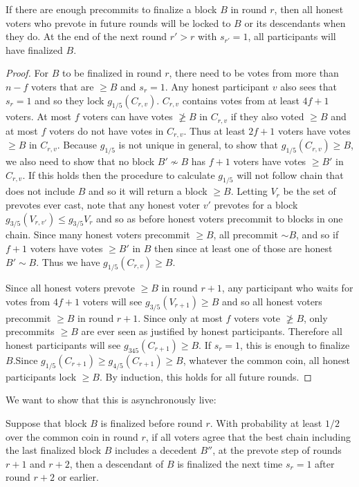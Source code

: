 \documentclass[a4paper,UKenglish,cleveref, autoref, thm-restate, anonymous]{lipics-v2019}
\begin{document}
{\begin{lemma} \label{lem:possibly-final-implies-permanent-lock}
If there are enough precommits to finalize a block $B$ in round $r$, then all honest voters who prevote in future rounds will be locked to $B$ or its descendants when they do. At the end of the next round $r' > r$ with $s_{r'}=1$, all participants will have finalized $B$.
\end{lemma}
\begin{proof}
For $B$ to be finalized in round $r$, there need to be votes from more than $n-f$ voters that are $\geq B$ and $s_r=1$. Any honest participant $v$ also sees that $s_r=1$ and so they lock $g_{1/5}(C_{r,v})$. $C_{r,v}$ contains votes from at least $4f+1$ voters. At most $f$  voters can have votes  $\not\geq B$ in $C_{r,v}$ if they also voted $\geq B$ and at most $f$ voters do not have votes in $C_{r,v}$.
 Thus at least $2f+1$ voters have votes $\geq B$ in $C_{r,v}$. Because $g_{1/5}$ is not unique in general, to show that $g_{1/5}(C_{r,v}) \geq B$, we also need to show that no block $B' \nsim B$ has $f+1$ voters have votes $\geq B'$ in $C_{r,v}$. If this holds then the procedure to calculate $g_{1/5}$ will not follow chain that does not include $B$ and so it will return a block $\geq B$.
 Letting $V_r$ be the set of prevotes ever cast, note that any honest voter $v'$ prevotes for a block $g_{3/5}(V_{r,v'}) \leq g_{3/5}{V_r}$ and so as before honest voters precommit to blocks in one chain.
 Since many honest voters precommit $\geq B$, all precommit $\sim B$, and so if $f+1$ voters have votes $\geq B'$ in $B$ then since at least one of those are honest $B' \sim B$. Thus we have $g_{1/5}(C_{r,v}) \geq B$.

Since all honest voters prevote $\geq B$ in round $r+1$, any participant who waits for votes from $4f+1$ voters will see $g_{3/5}(V_{r+1}) \geq B$ and so all honest voters precommit $\geq B$ in round $r+1$. Since only at most $f$ voters vote $\not \geq B$, only precommits $\geq B$ are ever seen as justified by honest participants. Therefore all honest participants will see $g_{345}(C_{r+1}) \geq 
B$.
If $s_r=1$, this is enough to finalize $B$.Since $g_{1/5}(C_{r+1}) \geq g_{4/5}(C_{r+1}) \geq 
B$, whatever the common coin, all honest participants lock $\geq B$. By induction, this holds for all future rounds.

\end{proof}

We want to show that this is asynchronously live:

\begin{proposition} Suppose that block $B$ is finalized before round $r$. With probability at least $1/2$ over the common coin in round $r$, if all voters agree that the best chain including the last finalized block $B$ includes a decedent $B''$, at the prevote step of rounds $r+1$ and $r+2$, then a descendant of $B$ is finalized the next time $s_r=1$ after round $r+2$ or earlier.
\end{proposition}

}
\end{document}
